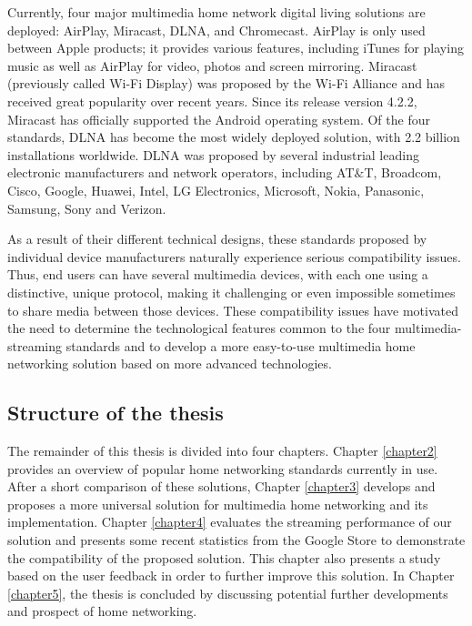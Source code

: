 Currently, four major multimedia home network digital living solutions  are
deployed: AirPlay, Miracast, DLNA, and Chromecast. AirPlay is only used
between Apple products; it provides various features, including iTunes for
playing music as well as AirPlay for video, photos and screen mirroring.
Miracast (previously called Wi-Fi Display) was proposed by the Wi-Fi Alliance
and has received great popularity over recent years. Since its release version
4.2.2, Miracast has officially supported the Android operating system. Of the
four standards, DLNA has become the most widely deployed solution, with 2.2
billion installations worldwide. DLNA was proposed by several industrial
leading electronic manufacturers and network operators, including AT$\&$T,
Broadcom, Cisco, Google, Huawei, Intel, LG Electronics, Microsoft, Nokia,
Panasonic, Samsung, Sony and Verizon.

As a result of their different technical designs, these standards proposed by
individual device manufacturers naturally experience serious compatibility
issues. Thus, end users can have several multimedia devices, with each one
using a distinctive, unique protocol, making it challenging or even impossible
sometimes to share media between those devices. These compatibility issues have
motivated the need to determine the technological features common to the four
multimedia-streaming standards and to develop a more easy-to-use multimedia
home networking solution based on more advanced technologies.

\subsection{Structure of the thesis}
The remainder of this thesis is divided into four chapters. Chapter
\ref{chapter2} provides an overview of popular home networking standards
currently in use. After a short comparison of these solutions, Chapter
\ref{chapter3} develops and proposes a more universal solution for multimedia
home networking and its implementation.
Chapter \ref{chapter4} evaluates the streaming performance of our solution and
presents some recent statistics from the Google Store to demonstrate the
compatibility of the proposed solution. This chapter also presents a study
based on the user feedback in order to further improve this solution. In
Chapter \ref{chapter5}, the thesis is concluded by  discussing potential 
further developments and prospect of home networking.